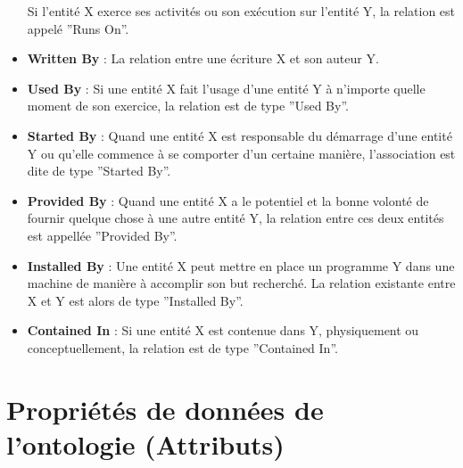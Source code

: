 \begin{itemize}
	  Si l'entité X exerce ses activités ou son exécution sur l'entité Y, la
	  relation est appelé ''Runs On''.
  \item \textbf{Written By} : 
	  La relation entre une écriture X et son auteur Y.
  \item \textbf{Used By} : 
	  Si une entité X fait l'usage d'une entité Y à n'importe quelle moment
	  de son exercice, la relation est de type ''Used By''.
  \item \textbf{Started By} : 
	  Quand une entité X est responsable du démarrage d'une entité Y ou
	  qu'elle commence à se comporter d'un certaine manière, l'association
	  est dite de type ''Started By''.
  \item \textbf{Provided By} : 
	  Quand une entité X a le potentiel et la bonne volonté de fournir
	  quelque chose à une autre entité Y, la relation entre ces deux entités
	  est appellée ''Provided By''.
  \item \textbf{Installed By} : 
	  Une entité X peut mettre en place un programme Y dans une machine de
	  manière à accomplir son but recherché. La relation existante entre X
	  et Y est alors de type ''Installed By''.
  \item \textbf{Contained In} :
	  Si une entité X est contenue dans Y, physiquement ou conceptuellement,
	  la relation est de type ''Contained In''.
\end{itemize}

\section{Propriétés de données de l'ontologie (Attributs)}

